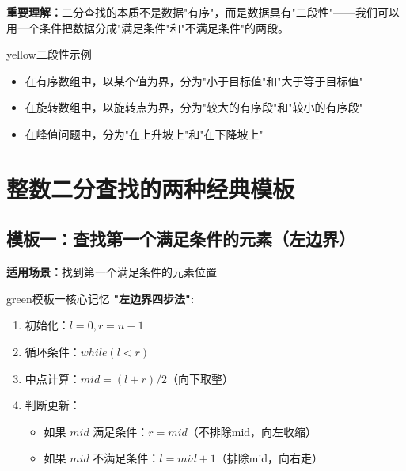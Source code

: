 \documentclass[12pt,a4paper]{article}
\begin{document}
	\textbf{重要理解：}二分查找的本质不是数据"有序"，而是数据具有"二段性"——我们可以用一个条件把数据分成"满足条件"和"不满足条件"的两段。
	
	\begin{mybox}{yellow}{二段性示例}
		\begin{itemize}
			\item 在有序数组中，以某个值为界，分为"小于目标值"和"大于等于目标值"
			\item 在旋转数组中，以旋转点为界，分为"较大的有序段"和"较小的有序段"
			\item 在峰值问题中，分为"在上升坡上"和"在下降坡上"
		\end{itemize}
	\end{mybox}
	
	\section{整数二分查找的两种经典模板}
	
	\subsection{模板一：查找第一个满足条件的元素（左边界）}
	
	\textbf{适用场景：}找到第一个满足条件的元素位置
	
	\begin{mybox}{green}{模板一核心记忆}
		\textbf{"左边界四步法":}
		\begin{enumerate}
			\item 初始化：$l = 0, r = n - 1$
			\item 循环条件：$while(l < r)$
			\item 中点计算：$mid = (l + r) / 2$（向下取整）
			\item 判断更新：
			\begin{itemize}
				\item 如果 $mid$ 满足条件：$r = mid$（不排除mid，向左收缩）
				\item 如果 $mid$ 不满足条件：$l = mid + 1$（排除mid，向右走）
			\end{itemize}
		\end{enumerate}
	\end{mybox}
	
\end{document}
